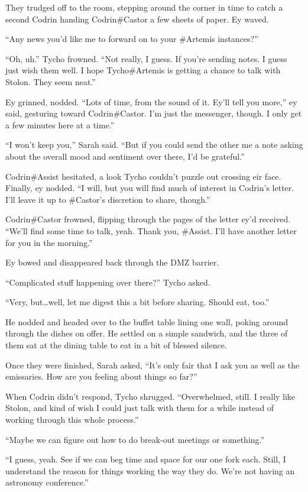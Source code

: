 They trudged off to the room, stepping around the corner in time to catch a second Codrin handing Codrin\#Castor a few sheets of paper. Ey waved.

``Any news you'd like me to forward on to your \#Artemis instances?''

``Oh, uh.'' Tycho frowned. ``Not really, I guess. If you're sending notes. I guess just wish them well. I hope Tycho\#Artemis is getting a chance to talk with Stolon. They seem neat.''

Ey grinned, nodded. ``Lots of time, from the sound of it. Ey'll tell you more,'' ey said, gesturing toward Codrin\#Castor. I'm just the messenger, though. I only get a few minutes here at a time.''

``I won't keep you,'' Sarah said. ``But if you could send the other me a note asking about the overall mood and sentiment over there, I'd be grateful.''

Codrin\#Assist hesitated, a look Tycho couldn't puzzle out crossing eir face. Finally, ey nodded. ``I will, but you will find much of interest in Codrin's letter. I'll leave it up to \#Castor's discretion to share, though.''

Codrin\#Castor frowned, flipping through the pages of the letter ey'd received. ``We'll find some time to talk, yeah. Thank you, \#Assist. I'll have another letter for you in the morning.''

Ey bowed and disappeared back through the DMZ barrier.

``Complicated stuff happening over there?'' Tycho asked.

``Very, but\ldots well, let me digest this a bit before sharing. Should eat, too.''

He nodded and headed over to the buffet table lining one wall, poking around through the dishes on offer. He settled on a simple sandwich, and the three of them sat at the dining table to eat in a bit of blessed silence.

Once they were finished, Sarah asked, ``It's only fair that I ask you as well as the emissaries. How are you feeling about things so far?''

When Codrin didn't respond, Tycho shrugged. ``Overwhelmed, still. I really like Stolon, and kind of wish I could just talk with them for a while instead of working through this whole process.''

``Maybe we can figure out how to do break-out meetings or something.''

``I guess, yeah. See if we can beg time and space for our one fork each. Still, I understand the reason for things working the way they do. We're not having an astronomy conference.''

